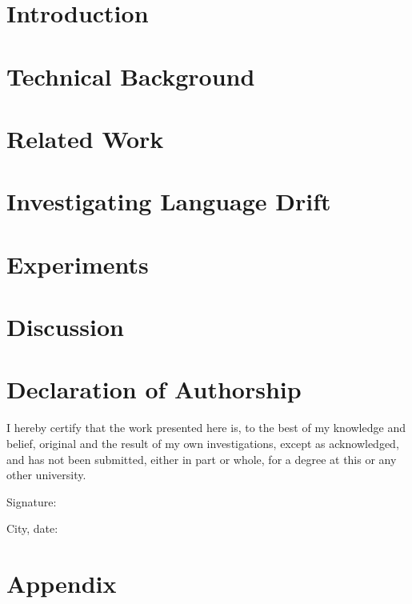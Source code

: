 \documentclass[11pt, twoside, openright]{report} %
\begin{document}
\tableofcontents

\chapter{Introduction}
\label{chapter01}


 \chapter{Technical Background}
 \label{chapter02}
 
 
\chapter{Related Work}
\label{chapter03}


\chapter{Investigating Language Drift}
\label{chapter04}


\chapter{Experiments}
\label{chapter05}


\chapter{Discussion}
\label{chapter06}


\chapter*{Declaration of Authorship}
I hereby certify that the work presented here is, to the best of my knowledge and belief, original and the result of my own investigations, except as acknowledged, and has not been submitted, either in part or whole, for a degree at this or any other university.

\vspace{2cm}
Signature:~\makebox[3in]{\hrulefill}

\vspace{1cm}
City, date:~\makebox[3in]{\hrulefill} 

\appendix
\chapter{Appendix}	
\label{appendix}


\printbibliography
%
\end{document}
